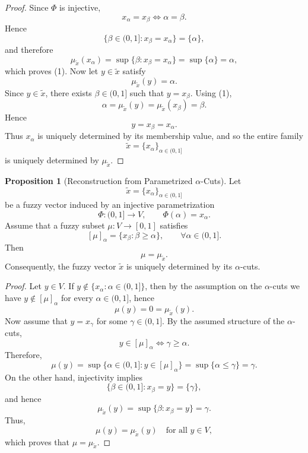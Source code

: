 \documentclass[preprint,12pt]{elsarticle}
\theoremstyle{definition}
\newtheorem{proposition}{Proposition}[section]
\begin{document}
 \begin{proof}
 	Since \(\Phi\) is injective,
 	\[
 	x_\alpha=x_\beta
 	\iff
 	\alpha=\beta.
 	\]
 	Hence
 	\[
 	\{\beta\in(0,1]:x_\beta=x_\alpha\}
 	=
 	\{\alpha\},
 	\]
 	and therefore
 	\[
 	\mu_{\widetilde{x}}(x_\alpha)
 	=
 	\sup\{\beta:x_\beta=x_\alpha\}
 	=
 	\sup\{\alpha\}
 	=
 	\alpha,
 	\]
 	which proves (1).
 	Now let \(y\in\widetilde{x}\) satisfy
 	\[
 	\mu_{\widetilde{x}}(y)=\alpha.
 	\]
 	Since \(y\in\widetilde{x}\), there exists \(\beta\in(0,1]\) such that
 	\(y=x_\beta\).
 	Using (1),
 	\[
 	\alpha
 	=
 	\mu_{\widetilde{x}}(y)
 	=
 	\mu_{\widetilde{x}}(x_\beta)
 	=
 	\beta.
 	\]
 	Hence
 	\[
 	y=x_\beta=x_\alpha.
 	\]
 	Thus \(x_\alpha\) is uniquely determined by its membership value, and so
 	the entire family
 	\[
 	\widetilde{x}
 	=
 	\{x_\alpha\}_{\alpha\in(0,1]}
 	\]
 	is uniquely determined by \(\mu_{\widetilde{x}}\).
 	
 \end{proof}
 
 
 
 
 
 
\begin{proposition}[Reconstruction from Parametrized $\alpha$-Cuts]
	\label{prop:ReconstructionFromAlphaCuts}
	Let
	\[
	\widetilde{x}
	=
	\{x_\alpha\}_{\alpha\in(0,1]}
	\]
	be a fuzzy vector induced by an injective parametrization
	\[
	\Phi:(0,1]\to V,\qquad \Phi(\alpha)=x_\alpha.
	\]
	Assume that a fuzzy subset \(\mu:V\to[0,1]\) satisfies
	\[
	[\mu]_\alpha
	=
	\{x_\beta:\beta\ge\alpha\},
	\qquad \forall \alpha\in(0,1].
	\]Then
	\[
	\mu=\mu_{\widetilde{x}}.
	\]
	Consequently, the fuzzy vector \(\widetilde{x}\) is uniquely determined by its
	\(\alpha\)-cuts.
	
\end{proposition}
 
\begin{proof}
	Let \(y\in V\).
	If \(y\notin \{x_\alpha:\alpha\in(0,1]\}\), then
	by the assumption on the \(\alpha\)-cuts we have
	\(y\notin[\mu]_\alpha\) for every \(\alpha\in(0,1]\), hence
	\[
	\mu(y)=0=\mu_{\widetilde{x}}(y).
	\]Now assume that \(y=x_\gamma\) for some \(\gamma\in(0,1]\).
	By the assumed structure of the \(\alpha\)-cuts,
	\[
	y\in[\mu]_\alpha \iff \gamma\ge \alpha.
	\]
	Therefore,
	\[
	\mu(y)
	=
	\sup\{\alpha\in(0,1]: y\in[\mu]_\alpha\}
	=
	\sup\{\alpha\le\gamma\}
	=
	\gamma.
	\]On the other hand, injectivity implies
	\[
	\{\beta\in(0,1]: x_\beta=y\}=\{\gamma\},
	\]
	and hence
	\[
	\mu_{\widetilde{x}}(y)
	=
	\sup\{\beta:x_\beta=y\}
	=
	\gamma.
	\]Thus,
	\[
	\mu(y)=\mu_{\widetilde{x}}(y)
	\quad \text{for all } y\in V,
	\]
	which proves that \(\mu=\mu_{\widetilde{x}}\).
	
\end{proof}
\end{document}

